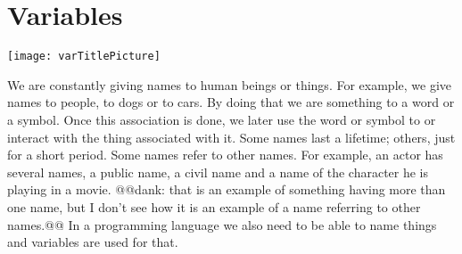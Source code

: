 \ifx\wholebook\relax\else



\fi

\newcommand{\dist}[0]{middle\xspace}


\chapter{Variables}\label{ch:variables}\label{cha:variable}

\begin{chapterfigure}
\texttt{[image: varTitlePicture]}
\end{chapterfigure}



We are constantly giving names to human beings or things. For example,
we give names to people, to dogs or to cars. By doing that we are
 something to a word or a symbol. Once this association is done,  we \newcommand{\remove}[1]{then} later use the word or symbol to  or \newcommand{\remove}[1]{to} interact
with the thing associated with it. \newcommand{\replace}[2]{Sometimes,}{Some} names \newcommand{\replace}[2]{are for}{last} a lifetime\newcommand{\replace}[2]{or sometimes}{; others,} just for a short period\newcommand{\remove}[1]{ of time}. \newcommand{\replace}[2]{Sometimes}{Some} names
refer to other names. For example, an actor has several names, a
public name, a civil name and a name of the character he is playing in
a movie. @@dank: that is an example of something having more than one name, but I don't see how it is an example of a name referring to other names.@@  In a programming language\newcommand{\remove}[1]{,} we also need to be able to name things\newcommand{\add}[1]{,} and variables are used for that. 


